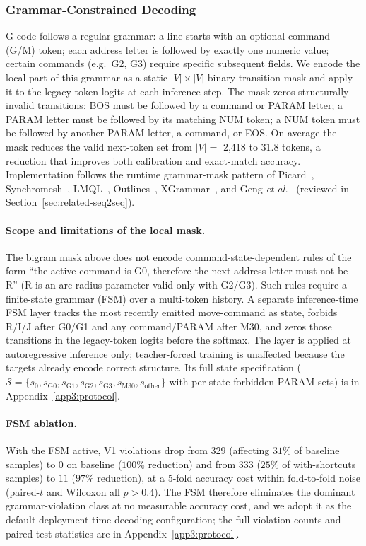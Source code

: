 \documentclass[sensors,article,submit,moreauthors,pdftex]{Definitions/mdpi}
\newcommand{\etal}{\textit{et al.}}
\begin{document}
\subsubsection{Grammar-Constrained Decoding}
\label{sec:grammar}

G-code follows a regular grammar: a line starts with an optional command (G/M) token; each address letter is followed by exactly one numeric value; certain commands (e.g.\ G2, G3) require specific subsequent fields. We encode the local part of this grammar as a static $|V| \times |V|$ binary transition mask and apply it to the legacy-token logits at each inference step. The mask zeros structurally invalid transitions: BOS must be followed by a command or PARAM letter; a PARAM letter must be followed by its matching NUM token; a NUM token must be followed by another PARAM letter, a command, or EOS. On average the mask reduces the valid next-token set from $|V|=$ 2{,}418 to 31.8 tokens, a reduction that improves both calibration and exact-match accuracy. Implementation follows the runtime grammar-mask pattern of Picard~\cite{picard}, Synchromesh~\cite{synchromesh}, LMQL~\cite{lmql}, Outlines~\cite{outlines}, XGrammar~\cite{xgrammar}, and Geng \etal~\cite{geng2023gcd} (reviewed in Section~\ref{sec:related-seq2seq}).

\paragraph{Scope and limitations of the local mask.} The bigram mask above does not encode command-state-dependent rules of the form ``the active command is G0, therefore the next address letter must not be R'' (R is an arc-radius parameter valid only with G2/G3). Such rules require a finite-state grammar (FSM) over a multi-token history. A separate inference-time FSM layer tracks the most recently emitted move-command as state, forbids R/I/J after G0/G1 and any command/PARAM after M30, and zeros those transitions in the legacy-token logits before the softmax. The layer is applied at autoregressive inference only; teacher-forced training is unaffected because the targets already encode correct structure. Its full state specification ($\mathcal{S}=\{s_0,s_{\text{G0}},s_{\text{G1}},s_{\text{G2}},s_{\text{G3}},s_{\text{M30}},s_{\text{other}}\}$ with per-state forbidden-PARAM sets) is in Appendix~\ref{app3:protocol}.

\paragraph{FSM ablation.} With the FSM active, V1 violations drop from 329 (affecting $31\%$ of baseline samples) to $0$ on baseline ($100\%$ reduction) and from 333 ($25\%$ of with-shortcuts samples) to $11$ ($97\%$ reduction), at a 5-fold accuracy cost within fold-to-fold noise (paired-$t$ and Wilcoxon all $p>0.4$). The FSM therefore eliminates the dominant grammar-violation class at no measurable accuracy cost, and we adopt it as the default deployment-time decoding configuration; the full violation counts and paired-test statistics are in Appendix~\ref{app3:protocol}.
\end{document}
